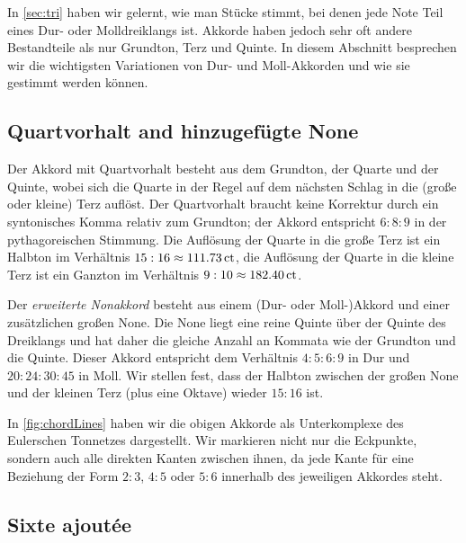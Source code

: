 \documentclass[ngerman,11pt]{scrartcl}
\begin{document}
In \cref{sec:tri} haben wir gelernt, wie man Stücke stimmt, bei denen jede Note
Teil eines Dur- oder Molldreiklangs ist. Akkorde haben jedoch sehr oft andere
Bestandteile als nur Grundton, Terz und Quinte. In diesem Abschnitt besprechen
wir die wichtigsten Variationen von Dur- und Moll-Akkorden und wie sie gestimmt
werden können.

\subsection{Quartvorhalt and hinzugefügte None}

Der Akkord mit Quartvorhalt besteht aus dem Grundton, der Quarte und der Quinte,
wobei sich die Quarte in der Regel auf dem nächsten Schlag in die (große oder
kleine) Terz auflöst. Der Quartvorhalt braucht keine Korrektur durch ein
syntonisches Komma relativ zum Grundton; der Akkord entspricht $6:8:9$ in der
pythagoreischen Stimmung.
Die Auflösung der Quarte in die große Terz ist ein Halbton im Verhältnis
$15:16\approx 111.73\,\mathrm{ct}$,
die Auflösung der Quarte in die kleine Terz ist ein Ganzton im Verhältnis
$9:10\approx 182.40\,\mathrm{ct}$.


Der \emph{erweiterte Nonakkord} besteht aus einem (Dur- oder Moll-)Akkord und
einer zusätzlichen großen None. Die None liegt eine reine Quinte über der Quinte
des Dreiklangs und hat daher die gleiche Anzahl an Kommata wie der Grundton und
die Quinte. Dieser Akkord entspricht dem Verhältnis $4:5:6:9$ in Dur und
$20:24:30:45$ in Moll. Wir stellen fest, dass der Halbton zwischen der großen
None und der kleinen Terz (plus eine Oktave) wieder $15:16$ ist.

In \cref{fig:chordLines} haben wir die obigen Akkorde als Unterkomplexe des
Eulerschen Tonnetzes dargestellt. Wir markieren nicht nur die Eckpunkte, sondern
auch alle direkten Kanten zwischen ihnen, da jede Kante für eine Beziehung der
Form $2:3$, $4:5$ oder $5:6$ innerhalb des jeweiligen Akkordes steht.

\subsection{Sixte ajoutée}
\end{document}
